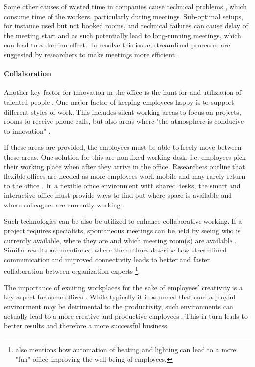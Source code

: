 Some other causes of wasted time in companies cause technical problems \cite{roomzilla3}, which consume time of the workers, particularly during meetings. Sub-optimal setups, for instance used but not 
booked rooms, and technical failures can cause delay of the meeting start and as such potentially 
lead to long-running meetings, which can lead to a domino-effect. To resolve this issue, streamlined processes are suggested by researchers to make meetings more efficient \cite{roomzilla3}. 

\paragraph{Collaboration}\label{sec:sda-collaboration}
Another key factor for innovation in the office is the hunt for and 
utilization of talented people \cite{hub13}. One major factor of keeping employees happy is to support different 
styles of work. This includes silent working areas to focus on projects, rooms to receive phone 
calls, but also areas where "the atmosphere is conducive to innovation" \cite{tieto}.

If these areas are provided, the employees must be able to freely move between these areas. One 
solution for this are non-fixed working desk, i.e. employees pick their working place when after 
they arrive in the office. Researchers outline that flexible offices are needed as more 
employees work mobile and may rarely return to the office \cite{occupiee}. In a flexible office environment with 
shared desks, the smart and interactive office must provide ways to find out where space is 
available and where colleagues are currently working \cite{tieto}.

Such technologies can be also be utilized to enhance collaborative working. If a project requires 
specialists, spontaneous meetings can be held by seeing who is currently available, where they are 
and which meeting room(s) are available \cite{tieto}. Similar results are mentioned \cite{hbcommunications} 
where the authors describe how streamlined communication and improved connectivity leads to better 
and faster collaboration between organization experts \footnote{\cite{hbcommunications} also 
mentions how automation of heating and lighting can lead to a more "fun" office improving the 
well-being of employees.}.

The importance of exciting workplaces for the sake of employees' creativity is a key aspect for some offices
\cite{roomzilla3}. While typically it is assumed that such a playful environment may be detrimental 
to the productivity, such environments can actually lead to a more creative and 
productive employees \cite{metroffice}. This in turn leads to better results and therefore a more 
successful business.

